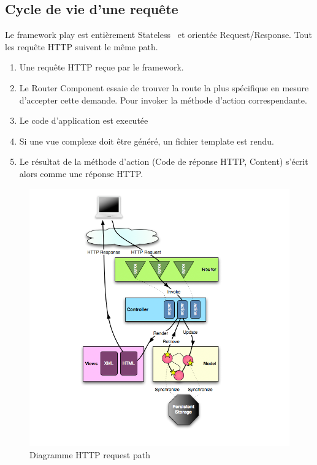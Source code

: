 \subsection{Cycle de vie d'une requête}
Le framework play est entièrement Stateless~\cite{rest} et orientée Request/Response. Tout les requête HTTP suivent le même path.
\begin{enumerate}
\item Une requête HTTP reçue par le framework.
\item Le Router Component essaie de trouver la route la plus spécifique en mesure d'accepter cette demande. Pour invoker la méthode d'action correspendante. 
\item Le code d'application est executée
\item Si une vue complexe doit être généré, un fichier template est rendu.
\item Le résultat de la méthode d'action (Code de réponse HTTP, Content) s'écrit alors comme une réponse HTTP.
\end{enumerate}
\begin{figure}[H]
        \centering
                \centering
                \includegraphics[width=\textwidth]{diagrams_path.png}
                \caption{Diagramme HTTP request path}
                \label{fig:Diagramme HTTP request path}
       
\end{figure}
\newpage
